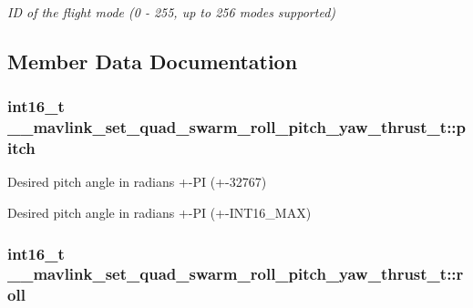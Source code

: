 \begin{DoxyCompactItemize}
\begin{DoxyCompactList}\small\item\em I\+D of the flight mode (0 -\/ 255, up to 256 modes supported) \end{DoxyCompactList}\end{DoxyCompactItemize}


\subsection{Member Data Documentation}
\hypertarget{struct____mavlink__set__quad__swarm__roll__pitch__yaw__thrust__t_acbe8d4bd179df9820c7e5f3de018708c}{
\subsubsection[{pitch}]{\setlength{\rightskip}{0pt plus 5cm}int16\+\_\+t \+\_\+\+\_\+mavlink\+\_\+set\+\_\+quad\+\_\+swarm\+\_\+roll\+\_\+pitch\+\_\+yaw\+\_\+thrust\+\_\+t\+::pitch}}\label{struct____mavlink__set__quad__swarm__roll__pitch__yaw__thrust__t_acbe8d4bd179df9820c7e5f3de018708c}


Desired pitch angle in radians +-\/\+P\+I (+-\/32767) 

Desired pitch angle in radians +-\/\+P\+I (+-\/\+I\+N\+T16\+\_\+\+M\+A\+X) \hypertarget{struct____mavlink__set__quad__swarm__roll__pitch__yaw__thrust__t_a4864c1c828d0beda42938e0fc539b59b}{
\subsubsection[{roll}]{\setlength{\rightskip}{0pt plus 5cm}int16\+\_\+t \+\_\+\+\_\+mavlink\+\_\+set\+\_\+quad\+\_\+swarm\+\_\+roll\+\_\+pitch\+\_\+yaw\+\_\+thrust\+\_\+t\+::roll}}\label{struct____mavlink__set__quad__swarm__roll__pitch__yaw__thrust__t_a4864c1c828d0beda42938e0fc539b59b}


